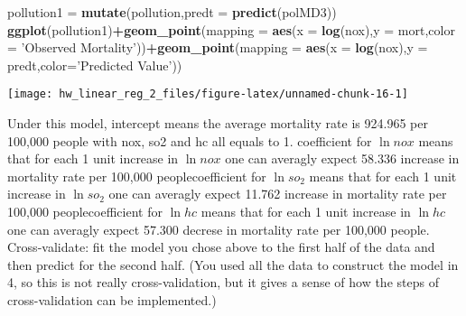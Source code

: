 \documentclass[]{article}
\newenvironment{Shaded}{\begin{snugshade}}{\end{snugshade}}
\newcommand{\DataTypeTok}[1]{\textcolor[rgb]{0.13,0.29,0.53}{#1}}
\newcommand{\FloatTok}[1]{\textcolor[rgb]{0.00,0.00,0.81}{#1}}
\newcommand{\KeywordTok}[1]{\textcolor[rgb]{0.13,0.29,0.53}{\textbf{#1}}}
\newcommand{\NormalTok}[1]{#1}
\newcommand{\OperatorTok}[1]{\textcolor[rgb]{0.81,0.36,0.00}{\textbf{#1}}}
\newcommand{\StringTok}[1]{\textcolor[rgb]{0.31,0.60,0.02}{#1}}
\begin{document}
\begin{Shaded}
\begin{Highlighting}[]
\NormalTok{pollution1 =}\StringTok{ }\KeywordTok{mutate}\NormalTok{(pollution,}\DataTypeTok{predt =} \KeywordTok{predict}\NormalTok{(polMD3))}
\KeywordTok{ggplot}\NormalTok{(pollution1)}\OperatorTok{+}\KeywordTok{geom_point}\NormalTok{(}\DataTypeTok{mapping =} \KeywordTok{aes}\NormalTok{(}\DataTypeTok{x =} \KeywordTok{log}\NormalTok{(nox),}\DataTypeTok{y =}\NormalTok{ mort,}\DataTypeTok{color =} \StringTok{'Observed Mortality'}\NormalTok{))}\OperatorTok{+}\KeywordTok{geom_point}\NormalTok{(}\DataTypeTok{mapping =} \KeywordTok{aes}\NormalTok{(}\DataTypeTok{x =} \KeywordTok{log}\NormalTok{(nox),}\DataTypeTok{y =}\NormalTok{ predt,}\DataTypeTok{color=}\StringTok{'Predicted Value'}\NormalTok{))}
\end{Highlighting}
\end{Shaded}

\begin{center}\texttt{[image: hw\_linear\_reg\_2\_files/figure-latex/unnamed-chunk-16-1]} \end{center}

Under this model, intercept means the average mortality rate is 924.965
per 100,000 people with nox, so2 and hc all equals to 1.\newline
coefficient for \(\ln nox\) means that for each 1 unit increase in
\(\ln nox\) one can averagly expect 58.336 increase in mortality rate
per 100,000 people\newline coefficient for \(\ln so_2\) means that for
each 1 unit increase in \(\ln so_2\) one can averagly expect 11.762
increase in mortality rate per 100,000 people\newline coefficient for
\(\ln hc\) means that for each 1 unit increase in \(\ln hc\) one can
averagly expect 57.300 decrese in mortality rate per 100,000
people. Cross-validate: fit the model you chose above to the
first half of the data and then predict for the second half. (You used
all the data to construct the model in 4, so this is not really
cross-validation, but it gives a sense of how the steps of
cross-validation can be implemented.)

\begin{Shaded}
\end{Shaded}
\end{document}
